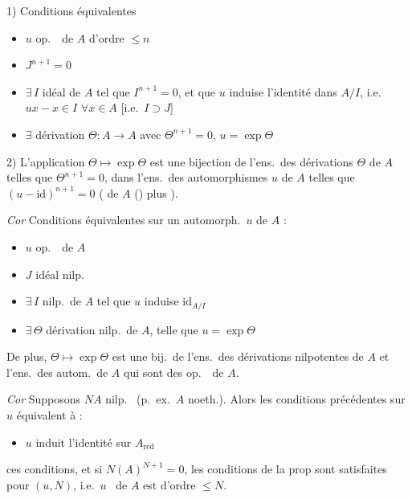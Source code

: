 \documentclass[11pt,a4paper]{article}
\begin{document}
1) Conditions équivalentes
\begin{itemize}
  \item[(i)] $u$ op.\ \ de $A$ d'ordre $\leq n$
  \item[(ii)] $J^{n+1} = 0$
  \item[(iii)] $\exists\, I$ idéal de $A$ tel que $I^{n+1} = 0$, et que $u$
  induise l'identité dans $A/I$, i.e.\ $ux - x \in I$ $\forall x \in A$
  [i.e.\ $I \supset J$]
  \item[\struck{(iv)}] $\exists$ dérivation $\Theta : A \to A$ avec
  $\Theta^{n+1} = 0$, $u = \exp \Theta$
\end{itemize}



2) L'application $\Theta \mapsto \exp \Theta$ est une bijection de l'ens.\ des
dérivations $\Theta$ de $A$ telles que $\Theta^{n+1} = 0$, dans l'ens.\ des
automorphismes $u$ de $A$ telles que $(u - \mathrm{id})^{n+1} = 0$ (\ill{} de
$A$ (\ill{}) \ill{} plus \ill{}).

\emph{Cor} Conditions équivalentes sur un automorph.\ $u$ de $A$ :
\begin{itemize}
  \item[(i)] $u$ op.\ \ de $A$
  \item[(ii)] $J$ idéal nilp.
  \item[(iii)] $\exists\, I$ nilp.\ de $A$ tel que $u$ induise
  $\mathrm{id}_{A/I}$
  \item[(iv)] $\exists\, \Theta$ dérivation nilp.\ de $A$, telle que
  $u = \exp \Theta$
\end{itemize}
De plus, $\Theta \mapsto \exp \Theta$ est une bij.\ de l'ens.\ des dérivations
nilpotentes de $A$ et l'ens.\ des autom.\ de $A$ qui sont des op.\
\ de $A$.

\emph{Cor}  Supposons $NA$ nilp.\ \ill{} (p.\ ex.\ $A$ noeth.).
Alors les conditions précédentes sur $u$ équivalent à :
\begin{itemize}
  \item[(v)] $u$ induit l'identité sur $A_{\mathrm{red}}$
\end{itemize}
 ces conditions, et si $N(A)^{N+1} = 0$, les conditions de la
prop sont satisfaites pour $(u, N)$, i.e.\ $u$ \uncertain{opérateur diff.}\ de
$A$ est d'ordre $\leq N$.
\end{document}
